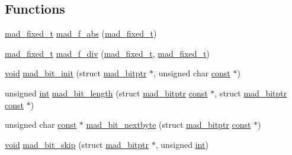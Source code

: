 \subsection*{Functions}
\begin{DoxyCompactItemize}
\item 
\hyperlink{libmad_2fixed_8h_a8a4b50d6d4d6827b7a8c871db1cbfd78}{mad\+\_\+fixed\+\_\+t} \hyperlink{mac_2config_2i386_2lib-src_2libmad_2mad_8h_a466c2db0842244c4f7770db941c56029}{mad\+\_\+f\+\_\+abs} (\hyperlink{libmad_2fixed_8h_a8a4b50d6d4d6827b7a8c871db1cbfd78}{mad\+\_\+fixed\+\_\+t})
\item 
\hyperlink{libmad_2fixed_8h_a8a4b50d6d4d6827b7a8c871db1cbfd78}{mad\+\_\+fixed\+\_\+t} \hyperlink{mac_2config_2i386_2lib-src_2libmad_2mad_8h_a293b1aa0fd7234bb7cfe48528a5c91b1}{mad\+\_\+f\+\_\+div} (\hyperlink{libmad_2fixed_8h_a8a4b50d6d4d6827b7a8c871db1cbfd78}{mad\+\_\+fixed\+\_\+t}, \hyperlink{libmad_2fixed_8h_a8a4b50d6d4d6827b7a8c871db1cbfd78}{mad\+\_\+fixed\+\_\+t})
\item 
\hyperlink{sound_8c_ae35f5844602719cf66324f4de2a658b3}{void} \hyperlink{mac_2config_2i386_2lib-src_2libmad_2mad_8h_a5cb09e97beb649283dc9de7f35dc0344}{mad\+\_\+bit\+\_\+init} (struct \hyperlink{structmad__bitptr}{mad\+\_\+bitptr} $\ast$, unsigned char \hyperlink{getopt1_8c_a2c212835823e3c54a8ab6d95c652660e}{const} $\ast$)
\item 
unsigned \hyperlink{xmltok_8h_a5a0d4a5641ce434f1d23533f2b2e6653}{int} \hyperlink{mac_2config_2i386_2lib-src_2libmad_2mad_8h_a5fe08816cab8812f2c67755cd857efde}{mad\+\_\+bit\+\_\+length} (struct \hyperlink{structmad__bitptr}{mad\+\_\+bitptr} \hyperlink{getopt1_8c_a2c212835823e3c54a8ab6d95c652660e}{const} $\ast$, struct \hyperlink{structmad__bitptr}{mad\+\_\+bitptr} \hyperlink{getopt1_8c_a2c212835823e3c54a8ab6d95c652660e}{const} $\ast$)
\item 
unsigned char \hyperlink{getopt1_8c_a2c212835823e3c54a8ab6d95c652660e}{const} $\ast$ \hyperlink{mac_2config_2i386_2lib-src_2libmad_2mad_8h_a9fc6c68afe35a50264107280814c5f43}{mad\+\_\+bit\+\_\+nextbyte} (struct \hyperlink{structmad__bitptr}{mad\+\_\+bitptr} \hyperlink{getopt1_8c_a2c212835823e3c54a8ab6d95c652660e}{const} $\ast$)
\item 
\hyperlink{sound_8c_ae35f5844602719cf66324f4de2a658b3}{void} \hyperlink{mac_2config_2i386_2lib-src_2libmad_2mad_8h_a09ebe709118c8ab4c3fc9678c0ce67a6}{mad\+\_\+bit\+\_\+skip} (struct \hyperlink{structmad__bitptr}{mad\+\_\+bitptr} $\ast$, unsigned \hyperlink{xmltok_8h_a5a0d4a5641ce434f1d23533f2b2e6653}{int})
\item 

\end{DoxyCompactItemize}
